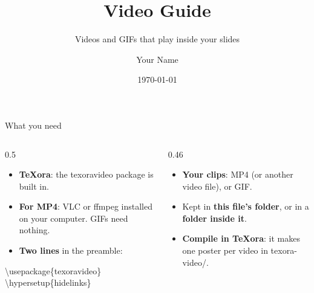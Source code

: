 \documentclass[aspectratio=169]{beamer}
\title{Video Guide}
\subtitle{Videos and GIFs that play inside your slides}
\author{Your Name}
\institute{Your Institution}
\date{\today}
\newcommand{\code}[1]{{\small\ttfamily #1}}
\begin{document}
{
\begin{frame}[plain]
  \vfill
  \begin{center}
    {\Huge\inserttitle\par}
    \vspace{0.6em}
    {\Large\insertsubtitle\par}
    \vspace{2em}
    {\insertauthor\par}
    {\small\insertinstitute\quad\insertdate\par}
  \end{center}
  \vfill
\end{frame}}

\begin{frame}[fragile]{What you need}
  \begin{columns}[T]
    \begin{column}{0.5\textwidth}
      \begin{itemize}
        \item \textbf{TeXora}: the \code{texoravideo} package is built in.
        \item \textbf{For MP4}: VLC or ffmpeg installed on your computer. GIFs need nothing.
        \item \textbf{Two lines} in the preamble:
      \end{itemize}
\begin{semiverbatim}\small
\textbackslash{}usepackage\{texoravideo\}
\textbackslash{}hypersetup\{hidelinks\}
\end{semiverbatim}
    \end{column}
    \begin{column}{0.46\textwidth}
      \begin{itemize}
        \item \textbf{Your clips}: MP4 (or another video file), or GIF.
        \item Kept in \textbf{this file's folder}, or in a \textbf{folder inside it}.
        \item \textbf{Compile in TeXora}: it makes one poster per video in \code{texora-video/}.
      \end{itemize}
    \end{column}
  \end{columns}
\end{frame}
\end{document}
